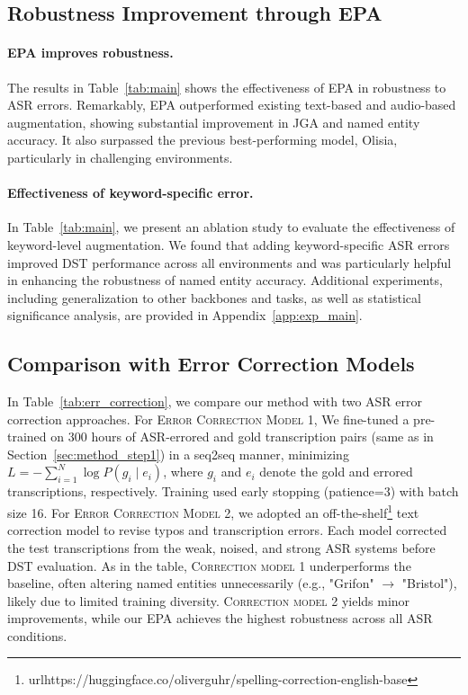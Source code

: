 
\subsection{Robustness Improvement through EPA}

\paragraph{EPA improves robustness. }The results in Table~\ref{tab:main} shows the effectiveness of EPA in  robustness to ASR errors. Remarkably, EPA outperformed existing text-based and audio-based augmentation, showing substantial improvement in JGA and named entity accuracy. It also surpassed the previous best-performing model, Olisia, particularly  in challenging environments.

\paragraph{Effectiveness of keyword-specific error.} In Table~\ref{tab:main}, we present an ablation study to evaluate the effectiveness of keyword-level augmentation. We found that adding keyword-specific ASR errors improved DST performance across all environments and was particularly helpful in enhancing the robustness of named entity accuracy. Additional experiments, including generalization to other backbones and tasks, as well as statistical significance analysis, are provided in Appendix~\ref{app:exp_main}.


\subsection{Comparison with Error Correction Models}

In Table~\ref{tab:err_correction}, we compare our method with two ASR error correction approaches. For \textsc{Error Correction Model 1}, We fine-tuned a pre-trained on 300 hours of ASR-errored and gold transcription pairs (same as in Section~\ref{sec:method_step1}) in a seq2seq manner, minimizing \( L = - \sum_{i=1}^{N} \log P(g_i \mid e_i) \),
where \(g_i\) and \(e_i\) denote the gold and errored transcriptions, respectively. 
Training used early stopping (patience=3) with batch size 16.
For \textsc{Error Correction Model 2}, we adopted an off-the-shelf\footnote{url{https://huggingface.co/oliverguhr/spelling-correction-english-base}} text correction model to revise typos and transcription errors. Each model corrected the test transcriptions from the weak, noised, and strong ASR systems before DST evaluation. 
As in the table, \textsc{Correction model 1} underperforms the baseline, often altering named entities unnecessarily (e.g., "Grifon" $\rightarrow$ "Bristol"), likely due to limited training diversity. 
\textsc{Correction model 2} yields minor improvements, while our EPA achieves the highest robustness across all ASR conditions.



